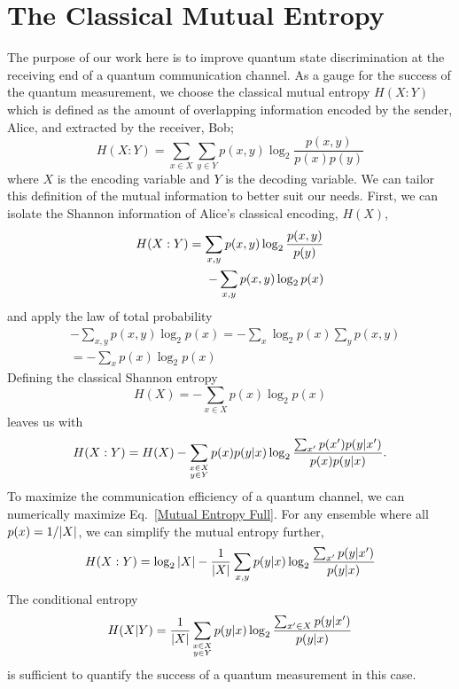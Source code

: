 \documentclass[aps,pra,twocolumn,showpacs,superscriptaddress,floatfix,10pt]{revtex4}
\begin{document}
\section{The Classical Mutual Entropy}
The purpose of our work here is to improve quantum state discrimination at the receiving end of a quantum communication channel. As a gauge for the success of the quantum measurement, we choose the classical mutual entropy $H(X:Y)$ which is defined as the amount of overlapping information encoded by the sender, Alice, and extracted by the receiver, Bob;
\begin{equation}
H(X:Y) = \sum_{x \in X} \sum_{y \in Y} p(x,y) \log_2 \frac{p(x,y)}{p(x) p(y)}
\end{equation}
where $X$ is the encoding variable and $Y$ is the decoding variable.
We can tailor this definition of the mutual information to better suit our needs. First, we can isolate the Shannon information of Alice's classical encoding, $H(X)$,
\begin{eqnarray}
\small H(X:Y) = \sum_{x,y} p(x,y) \log_2 \frac{p(x,y)}{p(y)} \\
- \sum_{x,y} p(x,y) \log_2 p(x) 
\end{eqnarray}
and apply the law of total probability
\begin{eqnarray}
& -\sum_{x,y} p(x,y) \log_2 p(x) = -\sum_x \log_2 p(x) \sum_y p(x,y) \nonumber \\ & = -\sum_x p(x) \log_2 p(x)
\end{eqnarray}
Defining the classical Shannon entropy
\begin{equation}
\label{Shannon Entropy}
	H(X) = -\sum_{x \in X} p(x) \log_2 p(x)
\end{equation}
leaves us with
\begin{equation}
\label{Mutual Entropy Full}
\small
	H(X:Y) = H(X) - \sum_{\substack{x \in X \\ y \in Y}} p(x) p(y|x) \log_2 \frac{\sum_{x^\prime} p(x^\prime) p(y|x^\prime)}{p(x) p(y|x)}.
\end{equation}
To maximize the communication efficiency of a quantum channel, we can numerically maximize Eq.~\ref{Mutual Entropy Full}.
For any ensemble where all $p(x) = 1/\abs{X}$, we can simplify the mutual entropy further,
\begin{equation}
\label{Mutual Entropy}
H(X:Y) = \log_2 \abs{X} - \frac{1}{\abs{X}} \sum_{x,y} p(y|x) \log_2 \frac{\sum_{x^\prime} p(y|x^\prime)}{p(y|x)}
\end{equation}
The conditional entropy
\begin{equation}
\label{Conditional Entropy}
\small H(X|Y) =  \frac{1}{\abs{X}} \sum_{\substack{x \in X \\ y \in Y}} p(y|x) \log_2 \frac{\sum_{x^\prime \in X} p(y|x^\prime)}{p(y|x)}
\end{equation}
is sufficient to quantify the success of a quantum measurement in this case. 
\end{document}
